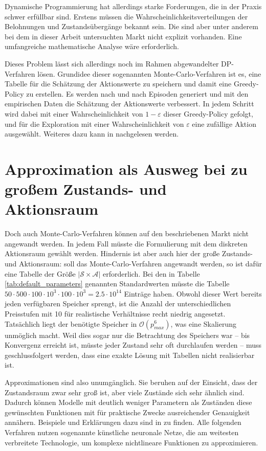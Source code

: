Dynamische Programmierung hat allerdings starke Forderungen, die in der Praxis schwer erfüllbar sind.
Erstens müssen die Wahrscheinlichkeitsverteilungen der Belohnungen und Zustandsübergänge bekannt sein.
Die sind aber unter anderem bei dem in dieser Arbeit untersuchten Markt nicht explizit vorhanden.
Eine umfangreiche mathematische Analyse wäre erforderlich.

Dieses Problem lässt sich allerdings noch im Rahmen abgewandelter DP-Verfahren lösen.
Grundidee dieser sogenannten Monte-Carlo-Verfahren ist es, eine Tabelle für die Schätzung der Aktionswerte zu speichern und damit eine Greedy-Policy zu erstellen.
Es werden nach und nach Episoden generiert und mit den empirischen Daten die Schätzung der Aktionswerte verbessert.
In jedem Schritt wird dabei mit einer Wahrscheinlichkeit von $1-\varepsilon$ dieser Greedy-Policy gefolgt, und für die Exploration mit einer Wahrscheinlichkeit von $\varepsilon$ eine zufällige Aktion ausgewählt.
Weiteres dazu kann in \cite{Sutton1998} nachgelesen werden.

\section{Approximation als Ausweg bei zu großem Zustands- und Aktionsraum}
Doch auch Monte-Carlo-Verfahren können auf den beschriebenen Markt nicht angewandt werden.
In jedem Fall müsste die Formulierung mit dem diskreten Aktionsraum gewählt werden.
Hindernis ist aber auch hier der große Zustands- und Aktionsraum: soll das Monte-Carlo-Verfahren angewandt werden, so ist dafür eine Tabelle der Größe \mbox{$|\mathcal{S} \times \mathcal{A}|$} erforderlich.
Bei den in Tabelle \ref{tab:default_parameters} genannten Standardwerten müsste die Tabelle \mbox{$50 \cdot 500 \cdot 100 \cdot 10^3 \cdot 100 \cdot 10^3 = 2.5 \cdot 10^{14}$} Einträge haben.
Obwohl dieser Wert bereits jeden verfügbaren Speicher sprengt, ist die Anzahl der unterschiedlichen Preisstufen mit 10 für realistische Verhältnisse recht niedrig angesetzt.
Tatsächlich liegt der benötigte Speicher in $\mathcal{O}\left(p_{max}^6\right)$, was eine Skalierung unmöglich macht.
Weil dies sogar nur die Betrachtung des Speichers war -- bis Konvergenz erreicht ist, müsste jeder Zustand sehr oft durchlaufen werden -- muss geschlussfolgert werden, dass eine exakte Lösung mit Tabellen nicht realisierbar ist.

Approximationen sind also unumgänglich.
Sie beruhen auf der Einsicht, dass der Zustandsraum zwar sehr groß ist, aber viele Zustände sich sehr ähnlich sind.
Dadurch können Modelle mit deutlich weniger Parametern als Zuständen diese gewünschten Funktionen  mit für praktische Zwecke ausreichender Genauigkeit annähern.
Beispiele und Erklärungen dazu sind in \cite{lapan2020deep} zu finden.
Alle folgenden Verfahren nutzen sogenannte künstliche neuronale Netze, die am weitesten verbreitete Technologie, um komplexe nichtlineare Funktionen zu approximieren.

